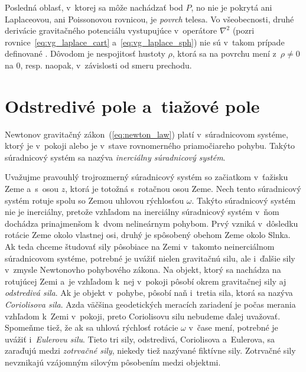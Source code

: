 \documentclass[a4paper, 12pt]{book}
\begin{document}
Posledná oblasť, v~ktorej sa môže nachádzať bod $P$, no nie je pokrytá ani
Laplaceovou, ani Poissonovou rovnicou, je \emph{povrch} telesa.  Vo
všeobecnosti, druhé derivácie gravitačného potenciálu vystupujúce v~operátore
$\nabla^2$ (pozri rovnice~\ref{eq:vg_laplace_cart} a~\ref{eq:vg_laplace_sph})
nie sú v~takom prípade definované \citep{Kellogg1967}.  Dôvodom je nespojitosť
hustoty $\rho$, ktorá sa na povrchu mení z~$\rho \neq 0$ na 0, resp. naopak,
v~závislosti od smeru prechodu.






\section{Odstredivé pole a~tiažové pole}
\label{sec:centrifugal_gravity_field}

Newtonov gravitačný zákon~(\ref{eq:newton_law}) platí v~súradnicovom systéme,
ktorý je v~pokoji alebo je v~stave rovnomerného priamočiareho pohybu.  Takýto
súradnicový systém sa nazýva \emph{inerciálny súradnicový systém}.

Uvažujme pravouhlý trojrozmerný súradnicový systém so začiatkom v~ťažisku Zeme
a~s~osou $z$, ktorá je totožná s~rotačnou osou Zeme.  Nech tento súradnicový
systém rotuje spolu so Zemou uhlovou rýchlosťou $\omega$.  Takýto súradnicový
systém nie je inerciálny, pretože vzhľadom na inerciálny súradnicový systém
v~ňom dochádza prinajmenšom k~dvom nelineárnym pohybom.  Prvý vzniká v~dôsledku
rotácie Zeme okolo vlastnej osi, druhý je spôsobený obehom Zeme okolo Slnka.
Ak teda chceme študovať sily pôsobiace na Zemi v~takomto neinerciálnom
súradnicovom systéme, potrebné je uvážiť nielen gravitačnú silu, ale i~ďalšie
sily v~zmysle Newtonovho pohybového zákona.  Na objekt, ktorý sa nachádza na
rotujúcej Zemi a~je vzhľadom k~nej v~pokoji pôsobí okrem gravitačnej sily aj
\emph{odstredivá sila}.  Ak je objekt v~pohybe, pôsobí naň i~tretia sila, ktorá
sa nazýva \emph{Coriolisova sila}.  Azda väčšina geodetických meracích
zariadení je počas merania vzhľadom k~Zemi v~pokoji, preto Coriolisovu silu
nebudeme ďalej uvažovať.  Spomeňme tiež, že ak sa uhlová rýchlosť rotácie
$\omega$ v~čase mení, potrebné je uvážiť i~\emph{Eulerovu silu}.  Tieto tri
sily, odstredivá, Coriolisova a~Eulerova, sa zaraďujú medzi \emph{zotrvačné
sily}, niekedy tiež nazývané fiktívne sily.  Zotrvačné sily nevznikajú
vzájomným silovým pôsobením medzi objektmi.
\end{document}

